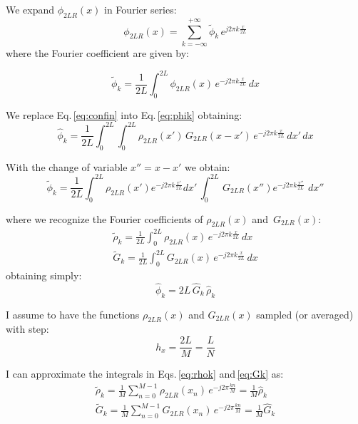 \documentclass[a4paper,12pt]{report}
\begin{document}
We expand $\phi_{2LR}(x)$ in Fourier series:
\begin{equation}
\phi_{2LR}(x) = \sum_{k=-\infty}^{+\infty} \tilde{\phi}_k\, e^{j2\pi k \frac{x}{2L}}
\label{eq:phifour}
\end{equation}
where the Fourier coefficient are given by:

\begin{equation}
\tilde{\phi}_k = \frac{1}{2L}\int_0^{2L} \phi_{2LR}(x)\, e^{-j2\pi k \frac{x}{2L}} \, dx
\label{eq:phik}
\end{equation}

We replace Eq.\,\eqref{eq:confin} into Eq.\,\eqref{eq:phik} obtaining:
\begin{equation}
\hat{\phi}_k = \frac{1}{2L}\int_0^{2L} \int_{0 }^{2L} 
\rho_{2LR}(x')\,G_{2LR}(x-x') \, e^{-j2\pi k \frac{x}{2L}} \,  dx'\, dx
\end{equation}

With the change of variable $x'' = x-x'$ we obtain:
\begin{equation}
\tilde{\phi}_k = 
\frac{1}{2L}
\int_0^{2L} 
\rho_{2LR}(x') e^{-j2\pi k \frac{x'}{2L}}dx'\,
\int_{0 }^{2L} 
\,G_{2LR}(x'') e^{-j2\pi k \frac{x''}{2L}}\,  \,  dx''
\end{equation}

where we recognize the Fourier coefficients of $\rho_{2LR}(x)$ and $\,G_{2LR}(x)$:
\begin{align}
\tilde{\rho}_k = \frac{1}{2L}\int_0^{2L} \rho_{2LR}(x)\, e^{-j2\pi k \frac{x}{2L}} \, dx \label{eq:rhok}\\
\tilde{G}_k = \frac{1}{2L}\int_0^{2L} G_{2LR}(x)\, e^{-j2\pi k \frac{x}{2L}} \, dx \label{eq:Gk}
\end{align}
obtaining simply:
\begin{equation}
\hat{\phi}_k = 2L \, \hat{G}_k \, \hat{\rho}_k
\label{eq:freqconv}
\end{equation}

I assume to have the functions $\rho_{2LR}(x)$ and  $G_{2LR}(x)$ sampled (or averaged) with step:
\begin{equation}
h_x = \frac{2L}{M} = \frac{L}{N}
\end{equation}

I can approximate the integrals in Eqs.\,\eqref{eq:rhok} and\,\eqref{eq:Gk} as:
\begin{align}
\tilde{\rho}_k = \frac{1}{M}\sum_{n=0}^{M-1} \rho_{2LR}(x_n)\, e^{-j2\pi  \frac{kn}{M}}  
= \frac{1}{M} \hat{\rho}_k
\label{eq:rhokfft}\\
\tilde{G}_k = \frac{1}{M}\sum_{n=0}^{M-1} G_{2LR}(x_n)\, e^{-j2\pi  \frac{kn}{M}} 
= \frac{1}{M} \hat{G}_k\label{eq:Gkfft}
\end{align}
\end{document}
